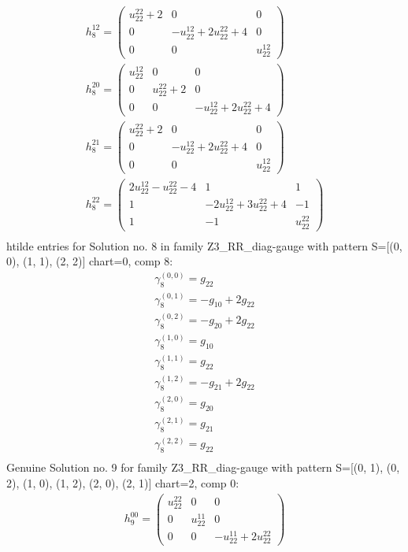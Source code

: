 \documentclass[a4paper, 11pt, twoside, onecolumn]{article}
\begin{document}
\begin{landscape}
\begin{gather*}
	 h_8^{12}=\begin{pmatrix}u^{22}_{22} + 2 & 0 & 0\\0 & - u^{12}_{22} + 2 u^{22}_{22} + 4 & 0\\0 & 0 & u^{12}_{22}\end{pmatrix}\\ 
	 h_8^{20}=\begin{pmatrix}u^{12}_{22} & 0 & 0\\0 & u^{22}_{22} + 2 & 0\\0 & 0 & - u^{12}_{22} + 2 u^{22}_{22} + 4\end{pmatrix}\\ 
	 h_8^{21}=\begin{pmatrix}u^{22}_{22} + 2 & 0 & 0\\0 & - u^{12}_{22} + 2 u^{22}_{22} + 4 & 0\\0 & 0 & u^{12}_{22}\end{pmatrix}\\ 
	 h_8^{22}=\begin{pmatrix}2 u^{12}_{22} - u^{22}_{22} - 4 & 1 & 1\\1 & - 2 u^{12}_{22} + 3 u^{22}_{22} + 4 & -1\\1 & -1 & u^{22}_{22}\end{pmatrix}\\ 
\end{gather*} 
htilde entries for Solution no. 8 in family Z3_RR_diag-gauge with pattern S=[(0, 0), (1, 1), (2, 2)] chart=0, comp 8: 
\begin{gather*} 
	 \gamma^{(0, 0)}_8=g_{22}\\ 
	 \gamma^{(0, 1)}_8=- g_{10} + 2 g_{22}\\ 
	 \gamma^{(0, 2)}_8=- g_{20} + 2 g_{22}\\ 
	 \gamma^{(1, 0)}_8=g_{10}\\ 
	 \gamma^{(1, 1)}_8=g_{22}\\ 
	 \gamma^{(1, 2)}_8=- g_{21} + 2 g_{22}\\ 
	 \gamma^{(2, 0)}_8=g_{20}\\ 
	 \gamma^{(2, 1)}_8=g_{21}\\ 
	 \gamma^{(2, 2)}_8=g_{22}\\ 
\end{gather*} 
Genuine Solution no. 9 for family Z3_RR_diag-gauge with pattern S=[(0, 1), (0, 2), (1, 0), (1, 2), (2, 0), (2, 1)] chart=2, comp 0: 
\begin{gather*} 
	 h_9^{00}=\begin{pmatrix}u^{22}_{22} & 0 & 0\\0 & u^{11}_{22} & 0\\0 & 0 & - u^{11}_{22} + 2 u^{22}_{22}\end{pmatrix}\\ 

\end{gather*}
\end{landscape}
\end{document}
